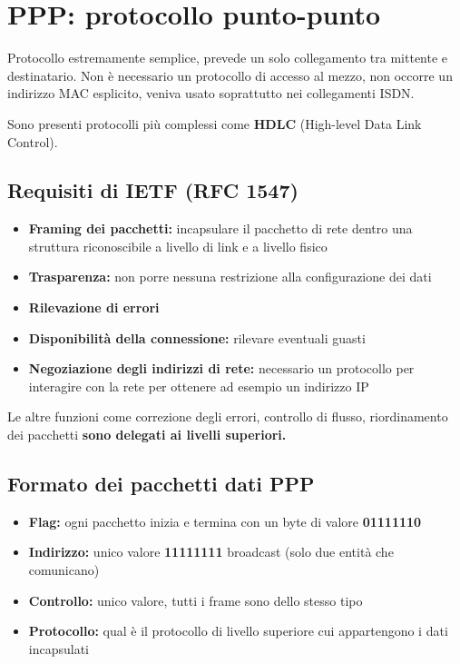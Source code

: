 \documentclass{report}
\begin{document}
\hypertarget{header-n241}{%
\section{PPP: protocollo punto-punto}\label{header-n241}}

Protocollo estremamente semplice, prevede un solo collegamento tra
mittente e destinatario. Non è necessario un protocollo di accesso al
mezzo, non occorre un indirizzo MAC esplicito, veniva usato soprattutto
nei collegamenti ISDN.

Sono presenti protocolli più complessi come \textbf{HDLC} (High-level
Data Link Control).

\hypertarget{header-n244}{%
\subsection{Requisiti di IETF (RFC 1547)}\label{header-n244}}

\begin{itemize}
\item
  \textbf{Framing dei pacchetti:} incapsulare il pacchetto di rete
  dentro una struttura riconoscibile a livello di link e a livello
  fisico
\item
  \textbf{Trasparenza: }non porre nessuna restrizione alla
  configurazione dei dati
\item
  \textbf{Rilevazione di errori}
\item
  \textbf{Disponibilità della connessione: }rilevare eventuali guasti
\item
  \textbf{Negoziazione degli indirizzi di rete: }necessario un
  protocollo per interagire con la rete per ottenere ad esempio un
  indirizzo IP
\end{itemize}

Le altre funzioni come correzione degli errori, controllo di flusso,
riordinamento dei pacchetti \textbf{sono delegati ai livelli superiori.}

\hypertarget{header-n257}{%
\subsection{Formato dei pacchetti dati PPP}\label{header-n257}}

\begin{itemize}
\item
  \textbf{Flag: }ogni pacchetto inizia e termina con un byte di valore
  \textbf{01111110}
\item
  \textbf{Indirizzo: }unico valore \textbf{11111111} broadcast (solo due
  entità che comunicano)
\item
  \textbf{Controllo: }unico valore, tutti i frame sono dello stesso tipo
\item
  \textbf{Protocollo: }qual è il protocollo di livello superiore cui
  appartengono i dati incapsulati
\end{itemize}
\end{document}

